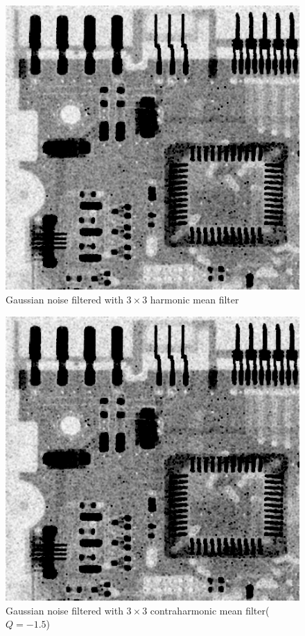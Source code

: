 \documentclass{article}
\begin{document}
\begin{figure}[]
	\centering
	\includegraphics[width=336pt]{../result/task2/gauss/gauss-harmonic.png}
	\caption{Gaussian noise filtered with $3 \times 3$ harmonic mean filter}
	\label{fig:gausshm}
\end{figure}

\begin{figure}[]
	\centering
	\includegraphics[width=336pt]{../result/task2/gauss/gauss-contraharmonic.png}
	\caption{Gaussian noise filtered with $3 \times 3$ contraharmonic mean filter($Q = -1.5$)}
	\label{fig:gausschm}
\end{figure}
\end{document}
